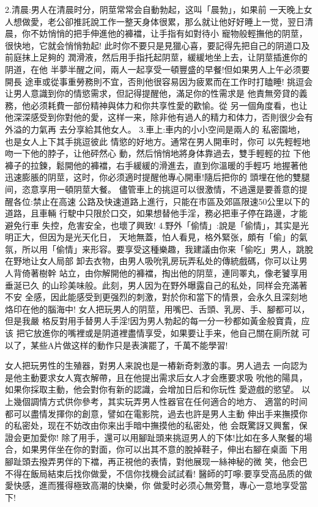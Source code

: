 \documentclass[12pt,UTF8]{ctexbook}
\begin{document}
2.清晨:男人在清晨时分，阴莖常常会自動勃起，这叫「晨勃」，如果前
一天晚上女人想做愛，老公卻推託說工作一整天身体很累，那么就让他好好睡上一觉，翌日清晨，你不妨悄悄的把手伸進他的褲襠，让手指有如對待小
寵物般輕撫他的阴莖，很快地，它就会悄悄勃起!
此时你不要只是見獵心喜，要記得先把自己的阴道口及前庭抹上足夠的
潤滑液，然后用手指托起阴莖，緩緩地坐上去，让阴莖插進你的阴道，在他
半夢半醒之间，兩人一起享受一頓豐盛的早餐!但如果男人上午必须要開長
途車或從事重勞務則不宜，否則他很容易因为疲累而在工作时打瞌睡!
挑逗会让男人意識到你的情慾需求，但記得提醒他，滿足你的性需求是
他責無旁貸的義務，他必须耗費一部份精神與体力和你共享性愛的歡愉。從
另一個角度看，也让他深深感受到你對他的愛，这样一来，除非他有過人的精力和体力，否則很少会有外溢的力氣再
去分享給其他女人。
3.車上:車内的小小空间是兩人的
私密園地，也是女人上下其手挑逗彼此
情慾的好地方。通常在男人開車时，你可
以先輕輕地吻一下他的脖子，让他砰然心
動，然后悄悄地將身体靠過去，雙手輕輕的拉
下他褲子的拉鍊，鬆開他的褲襠，右手緩緩的滑進去，直到你溫暖的手輕巧
地握著他迅速膨脹的阴莖，这时，你必须適时提醒他專心開車!隨后把你的
頭埋在他的雙腿间，恣意享用一頓阴莖大餐。
儘管車上的挑逗可以很激情，不過還是要善意的提醒各位:禁止在高速
公路及快速道路上進行，只能在市區及郊區限速50公里以下的道路，且車輛
行駛中只限於口交，如果想替他手淫，務必把車子停在路邊，才能避免行車
失控，危害安全，也壞了興致!
4.野外「偷情」:說是「偷情」，其实是光明正大，但因为是光天化日，
天地無蓋，怕人看見，格外緊张，頗有「偷」的氣氛，所以用「偷情」来形容。要享受这種樂趣，我建議由你来「偷吃」男人，跳脫在野地让女人局部
卸去衣物，由男人吸吮乳房玩弄私处的傳統戲碼，你可以让男人背倚著樹幹
站立，由你解開他的褲襠，掏出他的阴莖，連同睪丸，像老饕享用垂涎已久
的山珍美味般。此刻，男人因为在野外曝露自己的私处，同样会充滿著不安
全感，因此能感受到更强烈的刺激，對於你和當下的情景，会永久且深刻地
烙印在他的腦海中!
女人把玩男人的阴莖，用嘴巴、舌頭、乳房、手、腳都可以，但是我嚴
格反對用手替男人手淫!因为男人勃起的每一分一秒都如黃金般寶貴，应该
把它放進你的嘴裡或是阴道裡盡情享受，如果要让手来，他自己關在廁所就
可以了，某些A片做这样的動作只是表演罷了，千萬不能學習!

女人把玩男性的生殖器，對男人来說也是一樁新奇刺激的事。男人過去
一向認为是他主動要求女人寬衣解帶，且在他提出需求后女人才会應要求吸
吮他的陽具，如果你採取主動，他会對你有新的認識，会增加日后和你玩性
愛遊戲的慾望。
以上幾個調情方式供你參考，其实玩弄男人性器官在任何適合的地方、
適當的时间都可以盡情发揮你的創意，譬如在電影院，過去也許是男人主動
伸出手来撫摸你的私密处，现在不妨改由你来出手暗中撫摸他的私密处，他
会既驚訝又興奮，保證会更加愛你!
除了用手，還可以用腳趾頭来挑逗男人的下体!比如在多人聚餐的場
合，如果男伴坐在你的對面，你可以出其不意的脫掉鞋子，伸出右腳在桌面
下用腳趾頭去撥弄男伴的下襠，再正視他的表情，對他展现一絲神秘的微
笑，他会巴不得在飯局結束后找你做愛，不信你找機会試試看!
醫師的叮嚀:要享受高品质的做愛快感，進而獲得極致高潮的快樂，你
做愛时必须心無旁鶩，專心一意地享受當下!
\end{document}
